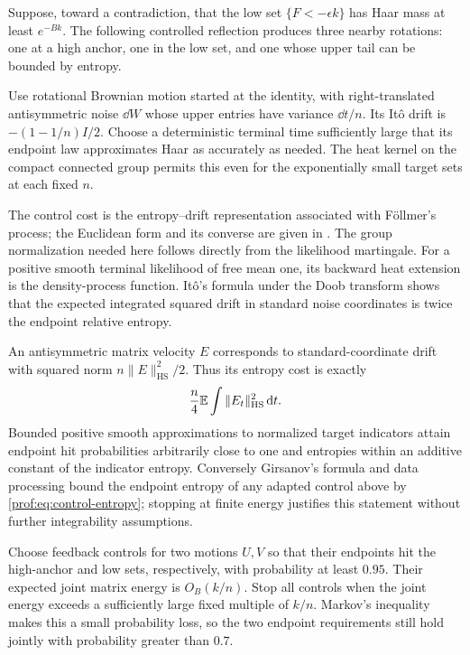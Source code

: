 Suppose, toward a contradiction, that the low set
$\{F<-\epsilon k\}$ has Haar mass at least $e^{-Bk}$.
The following controlled reflection produces three nearby rotations:
one at a high anchor, one in the low set, and one whose upper tail
can be bounded by entropy.

Use rotational Brownian motion started at the identity, with
right-translated antisymmetric noise $\dd W$ whose upper entries
have variance $\dd t/n$.  Its It\^o drift is
$-(1-1/n)I/2$.  Choose a deterministic terminal time sufficiently
large that its endpoint law approximates Haar as accurately as
needed.  The heat kernel on the compact connected group permits
this even for the exponentially small target sets at each fixed
$n$.

The control cost is the entropy--drift representation associated
with F\"ollmer's process; the Euclidean form and its converse are
given in \cite[Proposition~1 and Theorem~2]{Lehec2013Entropy}.
The group normalization needed here follows directly from the
likelihood martingale.  For a positive smooth terminal likelihood of free mean
one, its backward heat extension is the density-process function.
It\^o's formula under the Doob transform shows that the expected
integrated squared drift in standard noise coordinates is twice
the endpoint relative entropy.

An antisymmetric matrix velocity
$E$ corresponds to standard-coordinate drift with squared norm
$n\|E\|_{\mathrm{HS}}^2/2$.  Thus its entropy cost is exactly
\begin{equation}\label{prof:eq:control-entropy}
 \frac n4\mathbb E\int\|E_t\|_{\mathrm{HS}}^2\,\mathrm d t.
\end{equation}
Bounded positive smooth approximations to normalized target
indicators attain endpoint hit probabilities arbitrarily close to
one and entropies within an additive constant of the indicator
entropy.  Conversely Girsanov's formula and data processing bound
the endpoint entropy of any adapted control above by
\eqref{prof:eq:control-entropy}; stopping at finite energy justifies
this statement without further integrability assumptions.

Choose feedback controls for two motions $U,V$ so that their
endpoints hit the high-anchor and low sets, respectively, with
probability at least $0.95$.  Their expected joint matrix energy is
$O_B(k/n)$.  Stop all controls when the joint energy exceeds a
sufficiently large fixed multiple of $k/n$.  Markov's inequality
makes this a small probability loss, so the two endpoint requirements
still hold jointly with probability greater than $0.7$.

